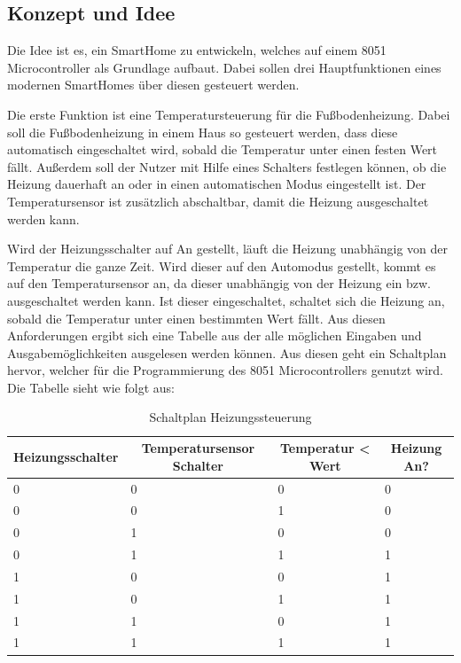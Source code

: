 \subsection{Konzept und Idee}

Die Idee ist es, ein SmartHome zu entwickeln, welches auf einem 8051 Microcontroller als Grundlage aufbaut. Dabei sollen drei Hauptfunktionen eines modernen SmartHomes über diesen gesteuert werden.

Die erste Funktion ist eine Temperatursteuerung für die Fußbodenheizung. Dabei soll die Fußbodenheizung in einem Haus so gesteuert werden, dass diese automatisch eingeschaltet wird, sobald die Temperatur unter einen festen Wert fällt. Außerdem soll der Nutzer mit Hilfe eines Schalters festlegen können, ob die Heizung dauerhaft an oder in einen automatischen Modus eingestellt ist. Der Temperatursensor ist zusätzlich abschaltbar, damit die Heizung ausgeschaltet werden kann.

Wird der Heizungsschalter auf An gestellt, läuft die Heizung unabhängig von der Temperatur die ganze Zeit. Wird dieser auf den Automodus gestellt, kommt es auf den Temperatursensor an, da dieser unabhängig von der Heizung ein bzw. ausgeschaltet werden kann. Ist dieser eingeschaltet, schaltet sich die Heizung an, sobald die Temperatur unter einen bestimmten Wert fällt.
Aus diesen Anforderungen ergibt sich eine Tabelle aus der alle möglichen Eingaben und Ausgabemöglichkeiten ausgelesen werden können. Aus diesen geht ein Schaltplan hervor, welcher für die Programmierung des 8051 Microcontrollers genutzt wird.
Die Tabelle sieht wie folgt aus:

\begin{table}[]
\centering
\caption{Schaltplan Heizungssteuerung}
\label{my-label}
\begin{tabular}{|l|l|l|l|}
\hline
\multicolumn{1}{|c|}{\textbf{Heizungsschalter}} & \multicolumn{1}{c|}{\textbf{Temperatursensor Schalter}} & \multicolumn{1}{c|}{\textbf{Temperatur < Wert}} & \multicolumn{1}{c|}{\textbf{Heizung An?}} \\ \hline
 0 & 0 & 0 & 0 \\ \hline
 0 & 0 & 1 & 0 \\ \hline
 0 & 1 & 0 & 0 \\ \hline
 0 & 1 & 1 & 1 \\ \hline
 1 & 0 & 0 & 1 \\ \hline
 1 & 0 & 1 & 1 \\ \hline
 1 & 1 & 0 & 1 \\ \hline
 1 & 1 & 1 & 1 \\ \hline
\end{tabular}
\end{table}


